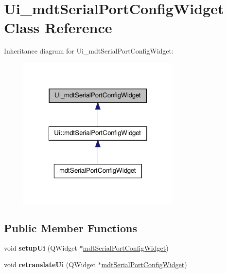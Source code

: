 \hypertarget{class_ui__mdt_serial_port_config_widget}{
\section{Ui\_\-mdtSerialPortConfigWidget Class Reference}
\label{class_ui__mdt_serial_port_config_widget}
}


Inheritance diagram for Ui\_\-mdtSerialPortConfigWidget:\nopagebreak
\begin{figure}[H]
\begin{center}
\leavevmode
\includegraphics[width=230pt]{class_ui__mdt_serial_port_config_widget__inherit__graph}
\end{center}
\end{figure}
\subsection*{Public Member Functions}
\begin{DoxyCompactItemize}
\item 
\hypertarget{class_ui__mdt_serial_port_config_widget_a7bc09917cb653acb79c8ddeee96b5a99}{
void {\bfseries setupUi} (QWidget $\ast$\hyperlink{classmdt_serial_port_config_widget}{mdtSerialPortConfigWidget})}
\label{class_ui__mdt_serial_port_config_widget_a7bc09917cb653acb79c8ddeee96b5a99}

\item 
\hypertarget{class_ui__mdt_serial_port_config_widget_afdc8635645d12884a6b81ab0217fbdd2}{
void {\bfseries retranslateUi} (QWidget $\ast$\hyperlink{classmdt_serial_port_config_widget}{mdtSerialPortConfigWidget})}
\label{class_ui__mdt_serial_port_config_widget_afdc8635645d12884a6b81ab0217fbdd2}

\end{DoxyCompactItemize}
